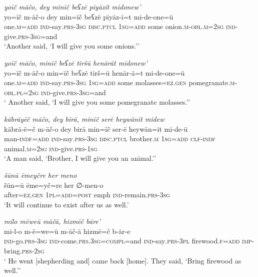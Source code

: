 \ea \label{ZP.119}
\textit{yoīč māčo, dey minīč beʕzē pīyāzīt midonew’} \\ 
\gll yo=īč m-āč-o dey min=īč beʕzē pīyāz-ī=t mi-de-one=ū \\ 
 one\textsc{.m}\textsc{=add} \textsc{ind-}say\textsc{.prs}\textsc{-3sg} \textsc{disc.ptcl} \textsc{1sg}\textsc{=add} some onion\textsc{.m}\textsc{-obl}\textsc{.m}\textsc{=\textsc{2sg}} \textsc{ind-}give\textsc{.prs}\textsc{-3sg}=and \\ 
\glt `Another said, ‘I will give you some onions.’'
\z 
 
\ea \label{ZP.120}
\textit{yoīč māčo, minīč beʕzē tiršū henārāt midonew’} \\ 
\gll yo=īč m-āč-o min=īč beʕzē tirš=ū henār-ā=t mi-de-one=ū \\ 
 one\textsc{.m}\textsc{=add} \textsc{ind-}say\textsc{.prs}\textsc{-3sg} \textsc{1sg}\textsc{=add} some molasses\textsc{\textsc{=ez.gen}} pomegranate\textsc{.m}\textsc{-obl}\textsc{.pl}\textsc{=\textsc{2sg}} \textsc{ind-}give\textsc{.prs}\textsc{-3sg}=and \\ 
\glt ` Another said, ‘I will give you some pomegranate molasses.’'
\z 
 
\ea \label{ZP.121}
\textit{kābrāyēč māčo, dey birā, minīč serē heywānit midew} \\ 
\gll kābrā-ē=č m-āč-o dey birā min=īč ser-ē heywān=it mi-de-ū \\ 
 man\textsc{-indf}\textsc{=add} \textsc{ind-}say\textsc{.prs}\textsc{-3sg} \textsc{disc.ptcl} brother\textsc{.m} \textsc{1sg}\textsc{=add} \textsc{clf}\textsc{-indf} animal\textsc{.m}\textsc{=\textsc{2sg}} \textsc{ind-}give\textsc{.prs}\textsc{-\textsc{1sg}} \\ 
\glt `A man said, ‘Brother, I will give you an animal.’'
\z 
 
\ea \label{ZP.129}
\textit{šūnū ēmeyčre her meno} \\ 
\gll šūn=ū ēme=yč=re her ∅-men-o \\ 
 after\textsc{\textsc{=ez.gen}} \textsc{1pl}\textsc{=add}\textsc{=\textsc{post}} emph \textsc{ind-}remain\textsc{.prs}\textsc{-3sg} \\ 
\glt `It will continue to exist after us as well.'
\z 
 
\ea \label{ŽP.24}
\textit{milo mēweū māčā, hizmēč bāre’} \\ 
\gll mi-l-o m-ē=we=ū m-āč-ā hizmē=č b-ār-e \\ 
 \textsc{ind-}go\textsc{.prs}\textsc{-3sg} \textsc{ind-}come\textsc{.prs}\textsc{.3sg}\textsc{=compl}=and \textsc{ind-}say\textsc{.prs}\textsc{-3pl} firewood\textsc{.f}\textsc{=add} \textsc{imp-}bring\textsc{.prs}-\textsc{2sg} \\ 
\glt ` He went [shepherding and] came back [home]. They said, ‘Bring firewood as well.’'
\z 
 
